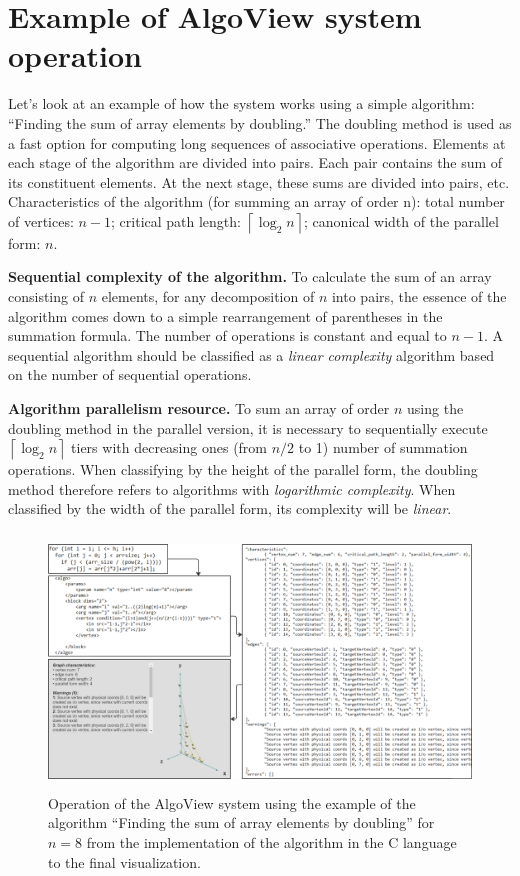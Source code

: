 \section{Example of AlgoView system operation}

Let's look at an example of how the system works using a simple algorithm: “Finding the sum of array elements by doubling.” The doubling method is used as a fast option for computing long sequences of associative operations. Elements at each stage of the algorithm are divided into pairs. Each pair contains the sum of its constituent elements. At the next stage, these sums are divided into pairs, etc. Characteristics of the algorithm (for summing an array of order n): total number of vertices: $n - 1$; critical path length: $\left\lceil{\log_2n}\right\rceil$; canonical width of the parallel form: $n$.

\textbf{Sequential complexity of the algorithm.} To calculate the sum of an array consisting of $n$ elements, for any decomposition of $n$ into pairs, the essence of the algorithm comes down to a simple rearrangement of parentheses in the summation formula. The number of operations is constant and equal to $n-1$. A sequential algorithm should be classified as a \textit{linear complexity} algorithm based on the number of sequential operations.

\textbf{Algorithm parallelism resource.} To sum an array of order $n$ using the doubling method in the parallel version, it is necessary to sequentially execute $\left\lceil{\log_2n}\right\rceil$ tiers with decreasing ones (from $n/2$ to 1) number of summation operations. When classifying by the height of the parallel form, the doubling method therefore refers to algorithms with \textit{logarithmic complexity}. When classified by the width of the parallel form, its complexity will be \textit{linear}.


\begin{figure}
\centering
\includegraphics[height=6.78cm]{assets/algo_example.png}
\caption{Operation of the AlgoView system using the example of the algorithm “Finding the sum of array elements by doubling” for $n = 8$ from the implementation of the algorithm in the C language to the final visualization.}
\end{figure}